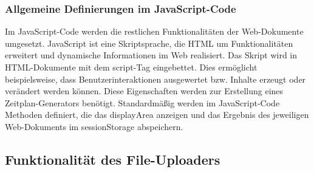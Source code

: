 \subsubsection{Allgemeine Definierungen im JavaScript-Code}
Im JavaScript-Code werden die restlichen Funktionalitäten der Web-Dokumente umgesetzt. JavaScript ist eine Skriptsprache, die HTML um Funktionalitäten erweitert und dynamische Informationen im Web realisiert. Das Skript wird in HTML-Dokumente mit dem script-Tag eingebettet. Dies ermöglicht beispielsweise, dass Benutzerinteraktionen ausgewertet bzw. Inhalte erzeugt oder verändert werden können. Diese Eigenschaften werden zur Erstellung eines Zeitplan-Generators benötigt. 
Standardmäßig werden im JavaScript-Code Methoden definiert, die das displayArea anzeigen und das Ergebnis des jeweiligen Web-Dokuments im sessionStorage abspeichern.

\subsection{Funktionalität des File-Uploaders}
  
